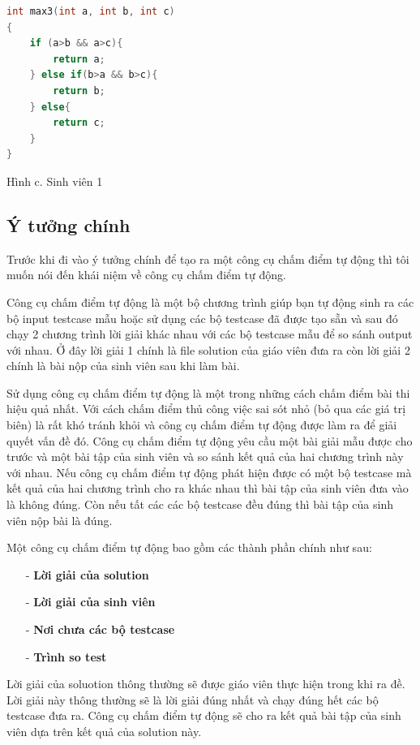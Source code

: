 \documentclass[12pt,a4paper]{article}
\begin{document}
\begin{lstlisting}[language=c]
int max3(int a, int b, int c) 
{ 
    if (a>b && a>c){
        return a;
    } else if(b>a && b>c){
        return b;
    } else{
        return c;
    }
}
\end{lstlisting}
\caption{Hình c. Sinh viên 1}

\subsection{Ý tưởng chính}
Trước khi đi vào ý tưởng chính để tạo ra một công cụ chấm điểm tự động thì tôi muốn nói đến khái niệm về công cụ chấm điểm tự động.

Công cụ chấm điểm tự động là một bộ chương trình giúp bạn tự động sinh ra các bộ input testcase mẫu hoặc sử dụng các bộ testcase đã được tạo sẵn và sau đó chạy 2 chương trình lời giải khác nhau với các bộ testcase mẫu để so sánh output với nhau. Ở đây lời giải 1 chính là file solution của giáo viên đưa ra còn lời giải 2 chính là bài nộp của sinh viên sau khi làm bài.

Sử dụng công cụ chấm điểm tự động là một trong những cách chấm điểm bài thi hiệu quả nhất. Với cách chấm điểm thủ công việc sai sót nhỏ (bỏ qua các giá trị biên) là rất khó tránh khỏi và công cụ chấm điểm tự động được làm ra để giải quyết vấn đề đó. Công cụ chấm điểm tự động yêu cầu một bài giải mẫu được cho trước và một bài tập của sinh viên và so sánh kết quả của hai chương trình này với nhau. Nếu công cụ chấm điểm tự động phát hiện được có một bộ testcase mà kết quả của hai chương trình cho ra khác nhau thì bài tập của sinh viên đưa vào là không đúng. Còn nếu tất các các bộ testcase đều đúng thì bài tập của sinh viên nộp bài là đúng.

Một công cụ chấm điểm tự động bao gồm các thành phần chính như sau:
\begin{itemize}
\item[-] \textbf{Lời giải của solution}
\item[-] \textbf{Lời giải của sinh viên}
\item[-] \textbf{Nơi chưa các bộ testcase}
\item[-] \textbf{Trình so test}
\end{itemize}

Lời giải của soluotion thông thường sẽ được giáo viên thực hiện trong khi ra đề. Lời giải này thông thường sẽ là lời giải đúng nhất và chạy đúng hết các bộ testcase đưa ra. Công cụ chấm điểm tự động sẽ cho ra kết quả bài tập của sinh viên dựa trên kết quả của solution này.
\end{document}
